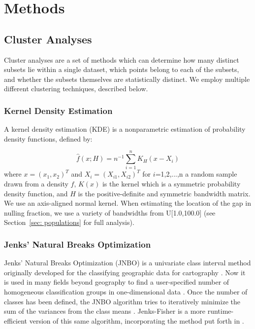\documentclass[fleqn,usenatbib]{mnras}
\begin{document}
\section{Methods}\label{sec:methods}

\subsection{Cluster Analyses}
\label{ssec: clustering}

Cluster analyses are a set of methods which can determine how many distinct subsets lie within a single dataset, which points belong to each of the subsets, and whether the subsets themselves are statistically distinct. We employ multiple different clustering techniques, described below.

\subsubsection{Kernel Density Estimation}
\label{sssec: kde}


A kernel density estimation (KDE) is a nonparametric estimation of probability density functions, defined by:

\begin{equation}
    \hat{f}(x;H) =n^{-1}\sum^n_{i=1}K_H(x-X_i)
\end{equation}
\noindent where $x=(x_1,x_2)^T$ and $X_i = (X_{i1},X_{i2})^T$ for $i$=1,2,...,n a random sample drawn from a density $f$, $K(x)$ is the kernel which is a symmetric probability density function, and $H$ is the positive-definite and symmetric bandwidth matrix. We use an axis-aligned normal kernel. When estimating the location of the gap in nulling fraction, we use a variety of bandwidths from  U[1.0,100.0] (see Section~\ref{sec: populations} for full analysis).

\subsubsection{Jenks' Natural Breaks Optimization}
\label{sssec: jenks}
Jenks' Natural Breaks Optimization (JNBO) is a univariate class interval method originally developed for the classifying geographic data for cartography \citep{jenks1977optimal}. Now it is used in many fields beyond geography to find a user-specified number of homogeneous classification groups in one-dimensional data \cite[e.g., ][]{rahadianto2015risk}. Once the number of classes has been defined, the JNBO algorithm tries to iteratively minimize the sum of the variances from the class means \citep{coulson1987matter}. Jenks-Fisher is a more runtime-efficient version of this same algorithm, incorporating the method put forth in \citet{fisher1958grouping} \citep{classInt2019}.
\end{document}
